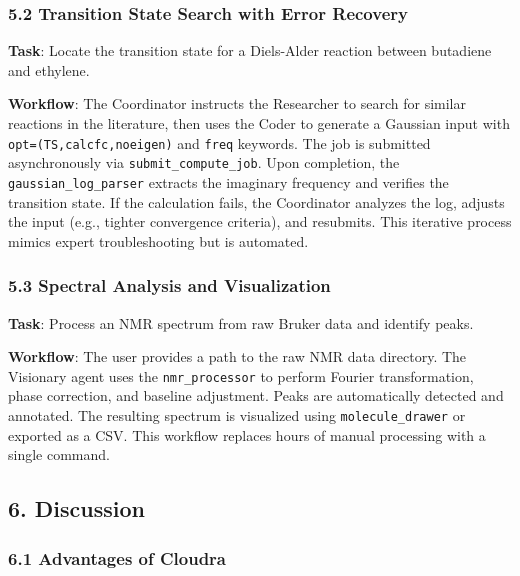 \hypertarget{transition-state-search-with-error-recovery}{%
\subsubsection{5.2 Transition State Search with Error
Recovery}\label{transition-state-search-with-error-recovery}}

\textbf{Task}: Locate the transition state for a Diels-Alder reaction
between butadiene and ethylene.

\textbf{Workflow}: The Coordinator instructs the Researcher to search
for similar reactions in the literature, then uses the Coder to generate
a Gaussian input with \texttt{opt=(TS,calcfc,noeigen)} and \texttt{freq}
keywords. The job is submitted asynchronously via
\texttt{submit\_compute\_job}. Upon completion, the
\texttt{gaussian\_log\_parser} extracts the imaginary frequency and
verifies the transition state. If the calculation fails, the Coordinator
analyzes the log, adjusts the input (e.g., tighter convergence
criteria), and resubmits. This iterative process mimics expert
troubleshooting but is automated.

\hypertarget{spectral-analysis-and-visualization}{%
\subsubsection{5.3 Spectral Analysis and
Visualization}\label{spectral-analysis-and-visualization}}

\textbf{Task}: Process an NMR spectrum from raw Bruker data and identify
peaks.

\textbf{Workflow}: The user provides a path to the raw NMR data
directory. The Visionary agent uses the \texttt{nmr\_processor} to
perform Fourier transformation, phase correction, and baseline
adjustment. Peaks are automatically detected and annotated. The
resulting spectrum is visualized using \texttt{molecule\_drawer} or
exported as a CSV. This workflow replaces hours of manual processing
with a single command.

\hypertarget{discussion}{%
\subsection{6. Discussion}\label{discussion}}

\hypertarget{advantages-of-cloudra}{%
\subsubsection{6.1 Advantages of Cloudra}\label{advantages-of-cloudra}}

